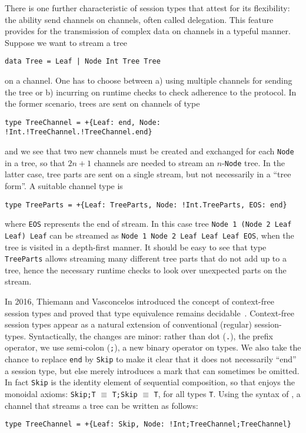There is one further characteristic of session types that attest for
its flexibility: the ability send channels on channels, often called
delegation. This feature provides for the transmission of complex data
on channels in a typeful manner. Suppose we want to stream a tree
%
\begin{lstlisting}
data Tree = Leaf | Node Int Tree Tree
\end{lstlisting}
%
on a channel. One has to choose between a) using multiple channels for
sending the tree or b) incurring on runtime checks to check adherence
to the protocol. In the former scenario, trees are sent on channels of
type
%
\begin{lstlisting}[morekeywords=end]
type TreeChannel = +{Leaf: end, Node: !Int.!TreeChannel.!TreeChannel.end}
\end{lstlisting}
%
and we see that two new channels must be created and exchanged for
each \lstinline|Node| in a tree, so that $2n+1$ channels are needed to
stream an $n$-\lstinline|Node| tree.
%
In the latter case, tree parts are sent on a single stream, but not
necessarily in a ``tree form''. A suitable channel type is
%
\begin{lstlisting}[morekeywords=end]
type TreeParts = +{Leaf: TreeParts, Node: !Int.TreeParts, EOS: end}
\end{lstlisting}
%
where \lstinline|EOS| represents the end of stream. In this case tree
\lstinline|Node 1 (Node 2 Leaf Leaf) Leaf| can be streamed as
\lstinline|Node 1 Node 2 Leaf Leaf Leaf EOS|, when the tree is visited
in a depth-first manner. It should be easy to see that type
\lstinline|TreeParts| allows streaming many different tree parts that
do not add up to a tree, hence the necessary runtime checks to look
over unexpected parts on the stream.

In 2016, Thiemann and Vasconcelos introduced the concept of
context-free session types and proved that type equivalence remains
decidable~\cite{DBLP:conf/icfp/ThiemannV16}.
%
Context-free session types appear as a natural extension of
conventional (regular) session-types. Syntactically, the changes are
minor: rather than dot (\lstinline|.|), the prefix operator, we use
semi-colon (\lstinline|;|), a new binary operator on types. We also
take the chance to replace \lstinline [morekeywords=end]|end| by
\lstinline|Skip| to make it clear that it does not necessarily ``end''
a session type, but else merely introduces a mark that can sometimes
be omitted. In fact \lstinline|Skip| is the identity element of
sequential composition, so that \freest{} enjoys the monoidal axioms:
\lstinline|Skip;T| $\equiv$ \lstinline|T;Skip| $\equiv$ \lstinline|T|,
for all types \lstinline|T|.
%
Using the syntax of \freest, a channel that streams a tree can be
written as follows:
%
\begin{lstlisting}
type TreeChannel = +{Leaf: Skip, Node: !Int;TreeChannel;TreeChannel}
\end{lstlisting}

